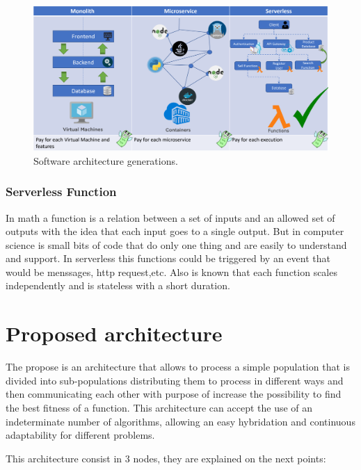 \documentclass[runningheads]{llncs}
\begin{document}
\begin{figure}[htp]
  \includegraphics[width=\textwidth]{img/architectures.png}
  \caption{Software architecture generations.} \label{fig1}
  \end{figure}

\subsubsection{Serverless Function} 
In math a function is a relation between a set of inputs and an allowed set of
outputs with the idea that each input goes to a single output. But in computer
science is small bits of code that do only one thing and are easily to
understand and support. In serverless this functions could be triggered by an
event that would be menssages, http request,etc. Also is known that each
function scales independently and is stateless with a short duration.


\section{Proposed architecture}

The propose is an architecture that allows to process a simple population that
is divided into sub-populations distributing them to process in different ways
and then communicating each other with purpose of increase the possibility to
find the best fitness of a function. This architecture can accept the use of an
indeterminate number of algorithms, allowing an easy hybridation and continuous
adaptability for different problems.

This architecture consist in 3 nodes, they are explained on the next points:
\end{document}

